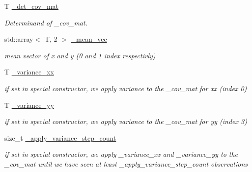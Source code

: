 \begin{DoxyCompactItemize}
T \hyperlink{classclara_1_1cone__state_aa42f4654a82f825dc3b89d4ec0b03deb}{\+\_\+det\+\_\+cov\+\_\+mat}
\begin{DoxyCompactList}\small\item\em Determinand of \+\_\+cov\+\_\+mat. \end{DoxyCompactList}\item 
std\+::array$<$ T, 2 $>$ \hyperlink{classclara_1_1cone__state_abf600e69be6a3791caefb93b214bb3b5}{\+\_\+mean\+\_\+vec}
\begin{DoxyCompactList}\small\item\em mean vector of x and y (0 and 1 index respectivly) \end{DoxyCompactList}\item 
\mbox{\label{classclara_1_1cone__state_ad3795d8f4b1e8d2fb7143ec4e9d03621}} 
T \hyperlink{classclara_1_1cone__state_ad3795d8f4b1e8d2fb7143ec4e9d03621}{\+\_\+variance\+\_\+xx}
\begin{DoxyCompactList}\small\item\em if set in special constructor, we apply variance to the \+\_\+cov\+\_\+mat for xx (index 0) \end{DoxyCompactList}\item 
\mbox{\label{classclara_1_1cone__state_ad0e89eea333ec4a94b94fd9833a7774f}} 
T \hyperlink{classclara_1_1cone__state_ad0e89eea333ec4a94b94fd9833a7774f}{\+\_\+variance\+\_\+yy}
\begin{DoxyCompactList}\small\item\em if set in special constructor, we apply variance to the \+\_\+cov\+\_\+mat for yy (index 3) \end{DoxyCompactList}\item 
\mbox{\label{classclara_1_1cone__state_a7d772b5d8599c5dda01d78221f3e4d73}} 
size\+\_\+t \hyperlink{classclara_1_1cone__state_a7d772b5d8599c5dda01d78221f3e4d73}{\+\_\+apply\+\_\+variance\+\_\+step\+\_\+count}
\begin{DoxyCompactList}\small\item\em if set in special constructor, we apply \+\_\+variance\+\_\+xx and \+\_\+variance\+\_\+yy to the \+\_\+cov\+\_\+mat until we have seen at least \+\_\+apply\+\_\+variance\+\_\+step\+\_\+count observations \end{DoxyCompactList}\end{DoxyCompactItemize}
